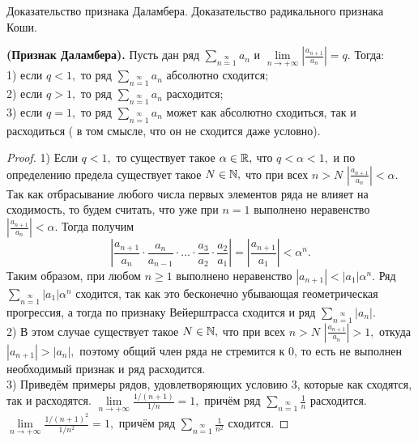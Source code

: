 \newpage
\begin{problem}
Доказательство признака Даламбера. Доказательство радикального признака Коши.
\end{problem}

\begin{theorem} \textbf{(Признак Даламбера).}
    Пусть дан ряд
    $\sum\limits_{n=1}\limits^{\infty}a_n$
    и $\lim\limits_{n\rightarrow+\infty}
        \left|\frac{a_{n+1}}{a_n}\right|=q.$
    Тогда:\\
    1) если $q<1,$ то ряд
    $\sum\limits_{n=1}\limits^{\infty}a_n$
    абсолютно сходится;\\
    2) если $q>1,$ то ряд
    $\sum\limits_{n=1}\limits^{\infty}a_n$
    расходится;\\
    3) если $q=1,$ то ряд
    $\sum\limits_{n=1}\limits^{\infty}a_n$
    может как абсолютно сходиться, так и
    расходиться ( в том смысле, что он
    не сходится даже условно).
\end{theorem}
\begin{proof}
    1) Если $q<1,$ то существует такое
    $\alpha\in\mathbb{R},$ что $q<\alpha<1,$
    и по определению предела существует
    такое $N\in\mathbb{N},$ что при всех $n>N$
    $\left|\frac{a_{n+1}}{a_n}\right|<\alpha.$
    Так как отбрасывание любого числа первых
    элементов ряда не влияет на сходимость,
    то будем считать, что уже при $n=1$
    выполнено неравенство
    $\left|\frac{a_{n+1}}{a_n}\right|<\alpha.$
    Тогда получим
    $$
        \left|\frac{a_{n+1}}{a_n}\cdot\frac{a_n}{a_{n-1}}\cdot...
        \cdot\frac{a_3}{a_2}\cdot\frac{a_2}{a_1}\right|=
        \left|\frac{a_{n+1}}{a_1}\right|<\alpha^{n}.
    $$
    Таким образом, при любом $n\geq1$ выполнено
    неравенство $|a_{n+1}|<|a_1|\alpha^n.$
    Ряд $\sum\limits_{n=1}\limits^{\infty}|a_1|
        \alpha^n$ сходится, так как это бесконечно
    убывающая геометрическая прогрессия, а тогда
    по признаку Вейерштрасса сходится и ряд
    $\sum\limits_{n=1}\limits^{\infty}|a_n|.$\\
    2) В этом случае существует такое $N\in\mathbb{N},$
    что при всех $n>N$ $\left|\frac{a_{n+1}}{a_n}\right|
        >1,$ откуда $|a_{n+1}|>|a_n|,$ поэтому
    общий член ряда не стремится к 0, то есть
    не выполнен необходимый признак и ряд расходится.\\
    3) Приведём примеры рядов, удовлетворяющих
    условию 3, которые как сходятся, так и расходятся.
    $\lim\limits_{n\rightarrow+\infty}\frac{1/(n+1)}{1/n}=1,$
    причём ряд $\sum\limits_{n=1}\limits^{\infty}
        \frac{1}{n}$ расходится.
    $\lim\limits_{n\rightarrow+\infty}\frac{1/(n+1)^2}{1/n^2}=1,$
    причём ряд $\sum\limits_{n=1}\limits^{\infty}
        \frac{1}{n^2}$ сходится.
\end{proof}

